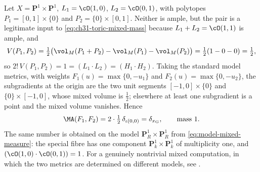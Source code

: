 \begin{example}
\label{ex:ch31-toric-mixed-numbers}
Let $X=\mathbf P^1\times\mathbf P^1$, $L_1=\cO(1,0)$,
$L_2=\cO(0,1)$, with polytopes $P_1=[0,1]\times\{0\}$ and
$P_2=\{0\}\times[0,1]$.  Neither is ample, but the pair is a legitimate
input to \eqref{eq:ch31-toric-mixed-mass} because
$L_1+L_2=\cO(1,1)$ is ample, and
\[
 V(P_1,P_2)=\tfrac12\bigl(\vol_M(P_1+P_2)-\vol_M(P_1)-\vol_M(P_2)\bigr)
 =\tfrac12(1-0-0)=\tfrac12 ,
\]
so $2!\,V(P_1,P_2)=1=(L_1\cdot L_2)=(H_1\cdot H_2)$.  Taking the standard
model metrics, with weights $F_1(u)=\max\{0,-u_1\}$ and
$F_2(u)=\max\{0,-u_2\}$, the subgradients at the origin are the two unit
segments $[-1,0]\times\{0\}$ and $\{0\}\times[-1,0]$, whose mixed volume
is $\tfrac12$; elsewhere at least one subgradient is a point and the mixed
volume vanishes.  Hence
\[
 \MA(F_1,F_2)=2\cdot\tfrac12\,\delta_{\iota(0,0)}=\delta_{x_{\mathrm G}},
 \qquad\text{mass }1 .
\]
The same number is obtained on the model $\mathbf P^1_R\times\mathbf P^1_R$
from \eqref{eq:model-mixed-measure}: the special fibre has one component
$\mathbf P^1_k\times\mathbf P^1_k$ of multiplicity one, and
$(\cO(1,0)\cdot\cO(0,1))=1$.  For a genuinely nontrivial mixed
computation, in which the two metrics are determined on different models,
see .
\end{example}

